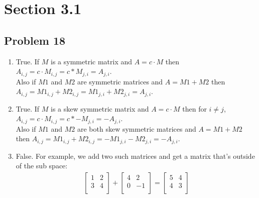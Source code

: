 \documentclass[a4paper,11pt]{article}
\begin{document}
\section*{Section 3.1}
\subsection*{Problem 18}
\begin{enumerate}[label=\alph*]
\item True. If $M$ is a symmetric matrix and $A=c \cdot M$ then $A_{i,j} = c \cdot M_{i,j} = c * M_{j,i} = A_{j,i}$. \\
Also if $M1$ and $M2$ are symmetric matrices and $A = M1 + M2$ then $A_{i,j} = M1_{i,j} + M2_{i,j} = M1_{j,i} + M2_{j,i} = A_{j,i}$.
\item True. If $M$ is a skew symmetric matrix and $A=c \cdot M$ then for $i \neq j$, $A_{i,j} = c \cdot M_{i,j} = c * -M_{j,i} = -A_{j,i}$. \\
Also if $M1$ and $M2$ are both skew symmetric matrices and $A = M1 + M2$ then $A_{i,j} = M1_{i,j} + M2_{i,j} = -M1_{j,i} -M2_{j,i} = -A_{j,i}$.
\item False. For example, we add two such matrices and get a matrix that's outside of the sub space:
\begin{align}
\begin{bmatrix}
1 & 2\\
3 & 4\\
\end{bmatrix}
+
\begin{bmatrix}
4 & 2\\
0 & -1\\
\end{bmatrix}
=
\begin{bmatrix}
5 & 4\\
4 & 3\\
\end{bmatrix}
\end{align}
\end{enumerate}
\end{document}
